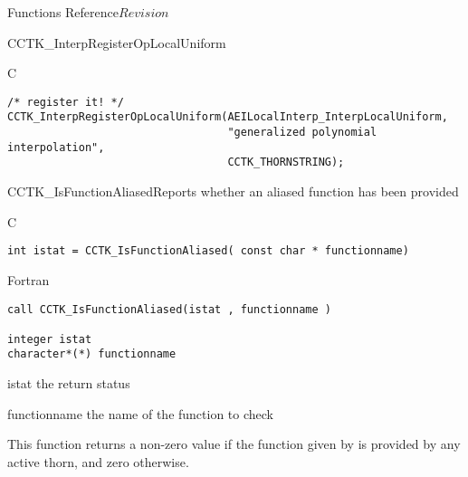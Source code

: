 \begin{cactuspart}{ Functions Reference}{}{$Revision$}
\begin{FunctionDescription}{CCTK\_InterpRegisterOpLocalUniform}
\begin{ExampleSection}
\begin{Example}{C}
\begin{verbatim}
/* register it! */
CCTK_InterpRegisterOpLocalUniform(AEILocalInterp_InterpLocalUniform,
                                  "generalized polynomial interpolation",
                                  CCTK_THORNSTRING);
\end{verbatim}
\end{Example}
\end{ExampleSection}
\end{FunctionDescription}


\begin{FunctionDescription}{CCTK\_IsFunctionAliased}{Reports whether an aliased function has been provided}
\label{CCTK-IsFunctionAliased}
\begin{SynopsisSection}
\begin{Synopsis}{C}
\begin{verbatim}int istat = CCTK_IsFunctionAliased( const char * functionname)\end{verbatim}
\end{Synopsis}
\begin{Synopsis}{Fortran}
\begin{verbatim}call CCTK_IsFunctionAliased(istat , functionname )

integer istat
character*(*) functionname\end{verbatim}
\end{Synopsis}
\end{SynopsisSection}
\begin{ParameterSection}
\begin{Parameter}{istat}
the return status
\end{Parameter}
\begin{Parameter}{functionname}
the name of the function to check
\end{Parameter}
\end{ParameterSection}
\begin{Discussion}
This function returns a non-zero value if the function given by
 is provided by any active thorn, and zero
otherwise.
\end{Discussion}
\end{FunctionDescription}


\end{cactuspart}
